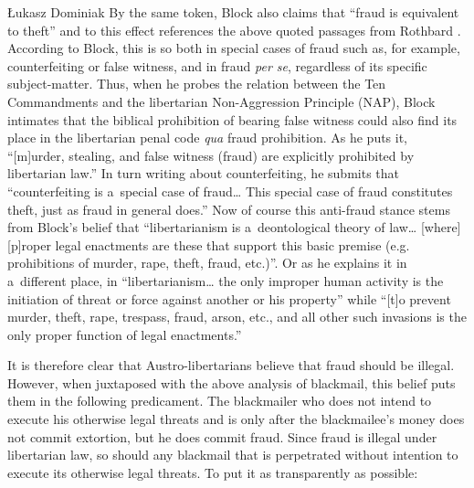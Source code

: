 \begin{artengenv}{Łukasz Dominiak}
By the same token, Block 
\parencite*[][p.294]{block_libertarian_1998} %
 also claims that ``fraud is equivalent to theft'' and to this effect references the above quoted passages from Rothbard 
\parencite*[][pp.77–78]{rothbard_ethics_1998}. %
 According to Block, this is so both in special cases of fraud such as, for example, counterfeiting or false witness, and in fraud \textit{per se}, regardless of its specific subject-matter. Thus, when he 
\parencite*[][p.38]{block_natural_2015} %
 probes the relation between the Ten Commandments and the libertarian Non-Aggression Principle (NAP), Block intimates that the biblical prohibition of bearing false witness could also find its place in the libertarian penal code \textit{qua} fraud prohibition. As he 
\parencite*[][p.38]{block_natural_2015} %
 puts it, ``[m]urder, stealing, and false witness (fraud) are explicitly prohibited by libertarian law.'' In turn writing about counterfeiting, he 
\parencite*[][p.99]{block_defending_2018} %
 submits that ``counterfeiting is a~special case of fraud… This special case of fraud constitutes theft, just as fraud in general does.'' Now of course this anti-fraud stance stems from Block's 
\parencite*[][p.275]{block_libertarianism_2004} %
 belief that ``libertarianism is a~deontological theory of law… [where] [p]roper legal enactments are these that support this basic premise (e.g. prohibitions of murder, rape, theft, fraud, etc.)''. Or as he 
\parencite*[][p.1889]{block_environmentalism_1998} %
 explains it in a~different place, in ``libertarianism… the only improper human activity is the initiation of threat or force against another or his property'' while ``[t]o prevent murder, theft, rape, trespass, fraud, arson, etc., and all other such invasions is the only proper function of legal enactments.''



It is therefore clear that Austro-libertarians believe that fraud should be illegal. However, when juxtaposed with the above analysis of blackmail, this belief puts them in the following predicament. The blackmailer who does not intend to execute his otherwise legal threats and is only after the blackmailee's money does not commit extortion, but he does commit fraud. Since fraud is illegal under libertarian law, so should any blackmail that is perpetrated without intention to execute its otherwise legal threats. To put it as transparently as possible:



\end{artengenv}
